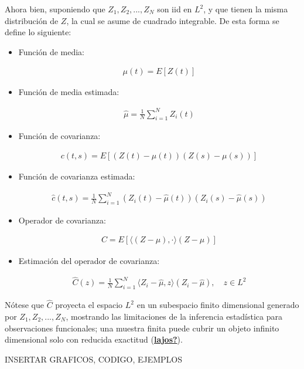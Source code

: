 \documentclass[
]{book}
\begin{document}
Ahora bien, suponiendo que \(Z_1,Z_2,...,Z_N\) son iid en \(L^2\), y que tienen la misma distribución de \(Z\), la cual se asume de cuadrado integrable. De esta forma se define lo siguiente:

\begin{itemize}
\item
  Función de media:

  \begin{align}
        \mu(t)=E[Z(t)]
    \end{align}
\item
  Función de media estimada:

  \begin{align}
        {\hat{\mu}}=\frac{1}{N}\sum_{i=1}^N Z_i(t)
    \end{align}
\item
  Función de covarianza:

  \begin{align}
        c(t,s)=E[(Z(t)-\mu(t))(Z(s)-\mu(s))]
    \end{align}
\item
  Función de covarianza estimada:

  \begin{align}
        {\hat{c}}(t,s)=\frac{1}{N}\sum_{i=1}^N(Z_i(t)-{\hat{\mu}}(t))(Z_i(s)-{\hat{\mu}}(s))
    \end{align}
\item
  Operador de covarianza:

  \begin{align}
        C=E[\langle(Z-\mu),\cdot \rangle (Z-\mu)]
    \end{align}
\item
  Estimación del operador de covarianza:

  \begin{align}
        {\hat{C}}(z)= \frac{1}{N} \sum_{i=1}^{N} \langle Z_i - {\hat{\mu}}, z\rangle ( Z_i-{\hat{\mu}}), \quad z\in L^2
    \end{align}
\end{itemize}

Nótese que \({\hat{C}}\) proyecta el espacio \(L^2\) en un subespacio finito dimensional generado por \(Z_1,Z_2,...,Z_N\), mostrando las limitaciones de la inferencia estadística para observaciones funcionales; una muestra finita puede cubrir un objeto infinito dimensional solo con reducida exactitud (\protect\hyperlink{ref-lajos}{\textbf{lajos?}}).

{INSERTAR GRAFICOS, CODIGO, EJEMPLOS}
\end{document}
